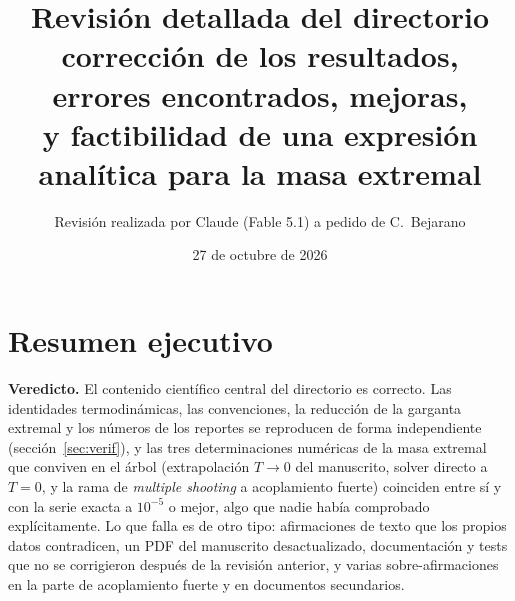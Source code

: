 \documentclass[10pt,a4paper]{article}
\title{Revisión detallada del directorio \code{BHs-main}\\
\large corrección de los resultados, errores encontrados, mejoras,\\ y factibilidad de una expresión analítica para la masa extremal}
\author{Revisión realizada por Claude (Fable 5.1) a pedido de C.~Bejarano}
\date{27 de octubre de 2026}
\begin{document}
\maketitle

\section{Resumen ejecutivo}

\textbf{Veredicto.} El contenido científico central del directorio es correcto. Las identidades
termodinámicas, las convenciones, la reducción de la garganta extremal y los números de los
reportes se reproducen de forma independiente (sección~\ref{sec:verif}), y las tres
determinaciones numéricas de la masa extremal que conviven en el árbol (extrapolación $T\to0$ del
manuscrito, solver directo a $T=0$, y la rama de \emph{multiple shooting} a acoplamiento fuerte)
coinciden entre sí y con la serie exacta a $10^{-5}$ o mejor, algo que nadie había comprobado
explícitamente. Lo que falla es de otro tipo: afirmaciones de texto que los propios datos
contradicen, un PDF del manuscrito desactualizado, documentación y tests que no se corrigieron
después de la revisión anterior, y varias sobre-afirmaciones en la parte de acoplamiento fuerte
y en documentos secundarios.
\end{document}

